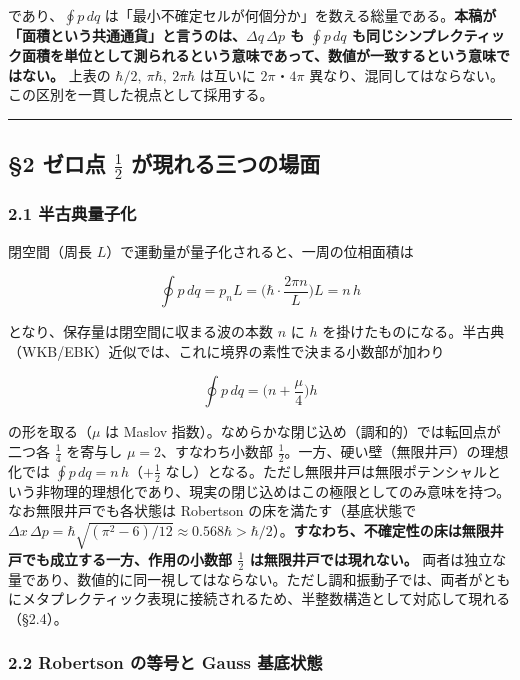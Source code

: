 \documentclass[
]{ltjsarticle}
\begin{document}
であり、\(\oint p\,dq\)
は「最小不確定セルが何個分か」を数える総量である。\textbf{本稿が「面積という共通通貨」と言うのは、\(\Delta q\,\Delta p\)
も \(\oint p\,dq\)
も同じシンプレクティック面積を単位として測られるという意味であって、数値が一致するという意味ではない。}
上表の \(\hbar/2,\ \pi\hbar,\ 2\pi\hbar\) は互いに \(2\pi\)・\(4\pi\)
異なり、混同してはならない。この区別を一貫した視点として採用する。

\begin{center}\rule{0.5\linewidth}{0.5pt}\end{center}

\subsection{\texorpdfstring{§2 ゼロ点 \(\tfrac12\)
が現れる三つの場面}{§2 ゼロ点 \textbackslash tfrac12 が現れる三つの場面}}\label{ux30bcux30edux70b9-tfrac12-ux304cux73feux308cux308bux4e09ux3064ux306eux5834ux9762}

\subsubsection{2.1
半古典量子化}\label{ux534aux53e4ux5178ux91cfux5b50ux5316}

閉空間（周長 \(L\)）で運動量が量子化されると、一周の位相面積は

\[\oint p\,dq = p_n L = \Big(\hbar\cdot\frac{2\pi n}{L}\Big)L = n\,h\]

となり、保存量は閉空間に収まる波の本数 \(n\) に \(h\)
を掛けたものになる。半古典（WKB/EBK）近似では、これに境界の素性で決まる小数部が加わり

\[\oint p\,dq = \Big(n+\frac{\mu}{4}\Big)h\]

の形を取る（\(\mu\) は Maslov
指数）。なめらかな閉じ込め（調和的）では転回点が二つ各 \(\tfrac14\)
を寄与し \(\mu=2\)、すなわち小数部
\(\tfrac12\)。一方、硬い壁（無限井戸）の理想化では
\(\oint p\,dq=n\,h\)（\(+\tfrac12\)
なし）となる。ただし無限井戸は無限ポテンシャルという非物理的理想化であり、現実の閉じ込めはこの極限としてのみ意味を持つ。なお無限井戸でも各状態は
Robertson の床を満たす（基底状態で
\(\Delta x\,\Delta p=\hbar\sqrt{(\pi^2-6)/12}\approx0.568\hbar>\hbar/2\)）。\textbf{すなわち、不確定性の床は無限井戸でも成立する一方、作用の小数部
\(\tfrac12\) は無限井戸では現れない。}
両者は独立な量であり、数値的に同一視してはならない。ただし調和振動子では、両者がともにメタプレクティック表現に接続されるため、半整数構造として対応して現れる（§2.4）。

\subsubsection{2.2 Robertson の等号と Gauss
基底状態}\label{robertson-ux306eux7b49ux53f7ux3068-gauss-ux57faux5e95ux72b6ux614b}
\end{document}

